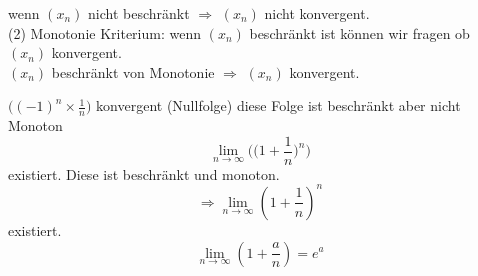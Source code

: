 wenn $(x_n)$ nicht beschränkt $\Rightarrow$ $(x_n)$ nicht konvergent.\\


(2) Monotonie Kriterium:
wenn $(x_n)$ beschränkt ist können wir fragen ob $(x_n)$    konvergent.\\


$(x_n)$ beschränkt von Monotonie $\Rightarrow$ $(x_n)$ konvergent.

\begin{example} %

$\Big((-1)^n \times\frac{1}{n} \Big)$ konvergent (Nullfolge) diese Folge ist beschränkt aber nicht Monoton 
$$ \lim_{n \to \infty}{\Big( \big(1 + \frac{1}{n}\big)^n \Big)} $$  existiert. Diese ist beschränkt und monoton. \\
$$\Rightarrow \lim_{n \to \infty}{(1+\frac{1}{n})^n}$$ 
existiert. 
$$\lim_{n \to \infty}{(1+\frac{a}{n})=e^a}$$
\end{example}
\newpage
